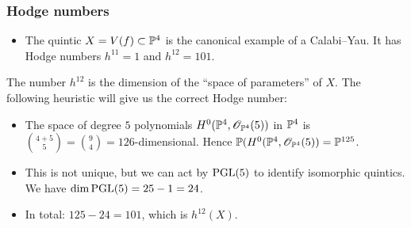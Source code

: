 \begin{frame}
\frametitle{Hodge numbers}

\begin{itemize}
	\item The quintic $X=V(f) \subset \P^4$ is the canonical example of a Calabi--Yau. It has Hodge numbers $h^{11}=1$ and $h^{12}=101$.
\end{itemize}

\begin{remark}[Heuristic]
The number $h^{12}$ is the dimension of the ``space of parameters'' of $X$. The following heuristic will give us the correct Hodge number:
\begin{itemize}
	\item The space of degree $5$ polynomials $H^0(\P^4,\OO_{\P^4}(5))$ in $\P^4$ is $\binom{4+5}{5}=\binom{9}{4}=126$-dimensional. Hence $\P(H^0(\P^4,\OO_{\P^4}(5)) = \P^{125}$.
	\item This is not unique, but we can act by $\PGL(5)$ to identify isomorphic quintics. We have $\dim \PGL(5)=25-1=24$.
	\item In total: $125-24=101$, which is $h^{12}(X)$.
\end{itemize}
\end{remark}

\end{frame}